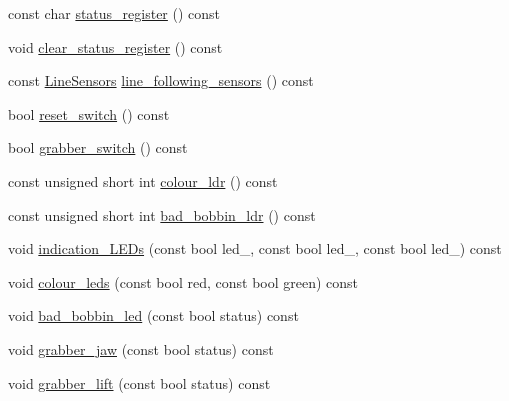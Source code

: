 \begin{DoxyCompactItemize}
\item 
const char \hyperlink{classIDP_1_1HardwareAbstractionLayer_a466af55473ec6b65d1f5069cfc88e774}{status\_\-register} () const 
\item 
void \hyperlink{classIDP_1_1HardwareAbstractionLayer_a1902d9260758777966ab362e21f3be42}{clear\_\-status\_\-register} () const 
\item 
const \hyperlink{structIDP_1_1LineSensors}{LineSensors} \hyperlink{classIDP_1_1HardwareAbstractionLayer_aca143d627de2ff9942069ad922d17ee5}{line\_\-following\_\-sensors} () const 
\item 
bool \hyperlink{classIDP_1_1HardwareAbstractionLayer_a4ce4bec948d6449e7cab3cfcd0de513f}{reset\_\-switch} () const 
\item 
bool \hyperlink{classIDP_1_1HardwareAbstractionLayer_a82ef6744041c174edb7f8982f44685b7}{grabber\_\-switch} () const 
\item 
const unsigned short int \hyperlink{classIDP_1_1HardwareAbstractionLayer_a0bc4534c003bb3cb91bd9b42e80ea8a7}{colour\_\-ldr} () const 
\item 
const unsigned short int \hyperlink{classIDP_1_1HardwareAbstractionLayer_a152c44415559cfe4e74a5560bbe92105}{bad\_\-bobbin\_\-ldr} () const 
\item 
void \hyperlink{classIDP_1_1HardwareAbstractionLayer_af776086df3d861a8bec53637c91b84ab}{indication\_\-LEDs} (const bool led\_, const bool led\_, const bool led\_) const 
\item 
void \hyperlink{classIDP_1_1HardwareAbstractionLayer_a6034826727571aec7d30999d8c88fa80}{colour\_\-leds} (const bool red, const bool green) const 
\item 
void \hyperlink{classIDP_1_1HardwareAbstractionLayer_a7e687c2254a9bfba55ff99ce191c27ae}{bad\_\-bobbin\_\-led} (const bool status) const 
\item 
void \hyperlink{classIDP_1_1HardwareAbstractionLayer_a577c1794c61814c3b23f5017437aba97}{grabber\_\-jaw} (const bool status) const 
\item 
void \hyperlink{classIDP_1_1HardwareAbstractionLayer_a0bf933820024212953433404e981be16}{grabber\_\-lift} (const bool status) const 
\end{DoxyCompactItemize}


